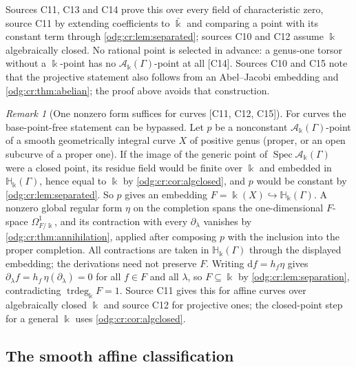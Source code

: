 \documentclass[11pt,oneside]{article}
\numberwithin{equation}{section}
\theoremstyle{definition}
\theoremstyle{remark}
\newtheorem{remark}[remark]{Remark}
\newcommand{\src}[1]{\textup{\textsf{\small[#1]}}}
\newcommand{\crH}{\mathbb H_\Bbbk(\Gamma)}
\newcommand{\crA}{\mathcal A_\Bbbk(\Gamma)}
\newcommand{\Spec}{\operatorname{Spec}}
\newcommand{\trdeg}{\operatorname{trdeg}}
\newcommand{\dif}{\mathrm d}
\begin{document}
Sources C11, C13 and C14 prove this over every field of characteristic zero,
source C11 by extending coefficients to $\bar\Bbbk$ and comparing a point with its
constant term through \cref{odg:cr:lem:separated}; sources C10 and C12 assume $\Bbbk$
algebraically closed. No rational point is selected in advance: a genus-one torsor
without a $\Bbbk$-point has no $\crA$-point at all \src{C14}. Sources C10 and C15 note that
the projective statement also follows from an Abel--Jacobi embedding and
\cref{odg:cr:thm:abelian}; the proof above avoids that construction.

\begin{remark}[One nonzero form suffices for curves \src{C11, C12, C15}]\label{odg:cr:rem:oneform}
For curves the base-point-free statement can be bypassed. Let $p$ be a
nonconstant $\crA$-point of a smooth geometrically integral curve $X$ of positive
genus (proper, or an open subcurve of a proper one). If the image of the generic
point of $\Spec\crA$ were a closed point, its residue field would be finite over
$\Bbbk$ and embedded in $\crH$, hence equal to $\Bbbk$ by
\cref{odg:cr:cor:algclosed}, and $p$ would be constant by
\cref{odg:cr:lem:separated}. So $p$ gives an embedding $F=\Bbbk(X)\hookrightarrow\crH$.
A nonzero global regular form $\eta$ on the completion spans the one-dimensional
$F$-space $\Omega^1_{F/\Bbbk}$, and its contraction with every $\partial_\lambda$
vanishes by \cref{odg:cr:thm:annihilation}, applied after composing $p$ with the
inclusion into the proper completion. All contractions are taken in $\crH$
through the displayed embedding; the derivations need not preserve $F$.
Writing $\dif f=h_f\eta$ gives
$\partial_\lambda f=h_f\,\eta(\partial_\lambda)=0$ for all $f\in F$ and all $\lambda$,
so $F\subseteq\Bbbk$ by \cref{odg:cr:lem:separation}, contradicting
$\trdeg_\Bbbk F=1$. Source C11 gives this for affine curves over algebraically
closed $\Bbbk$ and source C12 for projective ones; the closed-point step for a
general $\Bbbk$ uses \cref{odg:cr:cor:algclosed}.
\end{remark}

\subsection{The smooth affine classification}\label{odg:cr:sub:affine}
\end{document}
